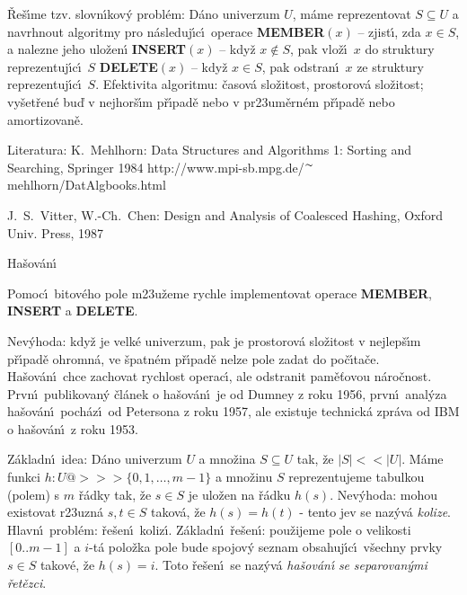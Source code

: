 \documentclass[a4paper,12pt]{article}
\begin{document}
\flushpar\v Re\v s\'\i me tzv. slovn\'\i kov\'y probl\'em: D\'ano 
univerzum $U$, m\'ame reprezentovat $S\subseteq U$ a navrhnout algoritmy pro 
n\'asle\-duj\'\i c\'\i\ operace\newline 
{\bf MEMBER$(x)$} -- zjist\'\i , zda $x\in S$, a nalezne jeho 
ulo\v zen\'\i\newline 
{\bf INSERT$(x)$} -- kdy\v z $x\notin S$, pak vlo\v z\'\i\ $x$ do struktury 
repre\-zentuj\'\i c\'\i\ $S$\newline 
{\bf DELETE$(x)$} -- kdy\v z $x\in S$, pak odstran\'\i\ $x$ ze struktury 
reprezentuj\'\i c\'\i\ $S$.\newline 
Efektivita algoritmu: \v casov\'a slo\v zitost, prostorov\'a 
slo\v zitost;\newline 
vy\-\v set\v ren\'e bu\v d v nejhor\v s\'\i m p\v r\'\i pad\v e nebo v 
pr\accent23um\v ern\'em p\v r\'\i pad\v e nebo amortizovan\v e.
\medskip

\flushpar Literatura:\newline 
K.~Mehlhorn: Data Structures and Algorithms 1: Sorting 
and Searching, Springer 1984\newline 
http://www.mpi-sb.mpg.de/$^{\thicksim}$mehlhorn/DatAlgbooks.html
\smallskip

\flushpar J.~S.~Vitter, W.-Ch.~Chen: Design and Analysis of 
Coalesced Hashing, Oxford Univ. Press, 1987
\newpage

\heading
Ha\v sov\'an\'\i
\endheading

\flushpar Pomoc\'\i\ bitov\'eho pole m\accent23u\v zeme rychle 
implementovat operace {\bf MEMBER}, {\bf INSERT} a {\bf DELETE}. 

\flushpar Nev\'yhoda: kdy\v z je velk\'e univerzum, pak je prostorov\'a 
slo\v zitost v nejlep\v s\'\i m p\v r\'\i pad\v e ohrom\-n\'a, ve \v spatn\'em 
p\v r\'\i pad\v e nelze pole zadat do po\v c\'\i ta\v ce.\newline 
Ha\v sov\'an\'\i\ chce zachovat rychlost operac\'\i , ale odstranit 
pam\v e\v to\-vou n\'aro\v cnost. Prvn\'\i\ publikovan\'y \v cl\'anek o 
ha\v sov\'an\'\i\ je od Dumney z roku 1956, prvn\'\i\ anal\'yza ha\v sov\'an\'\i\ 
poch\'az\'\i\ od Petersona z roku 1957, ale existuje technick\'a  
zpr\'ava od IBM o ha\v sov\'an\'\i\ z roku 1953.
\medskip

\flushpar Z\'akladn\'\i\ idea: D\'ano univerzum $U$ a mno\v zina 
$S\subseteq U$ tak, \v ze $|S|<<|U|$. M\'ame funkci 
$h:U@>>>\{0,1,\dots,m-1\}$ a mno\v zinu $S$ reprezentujeme 
tabulkou (polem) s $m$ \v r\'adky tak, \v ze $s\in S$ je ulo\v zen na 
\v r\'adku $h(s)$.\newline 
Nev\'yhoda: mohou existovat r\accent23uzn\'a $s,t\in S$ takov\'a, 
\v ze $h(s)=h(t)$ - tento jev se naz\'yv\'a \emph{kolize}.\newline 
Hlavn\'\i\ probl\'em: \v re\v sen\'\i\ koliz\'\i .\newline 
Z\'akladn\'\i\ \v re\v sen\'\i : pou\v zijeme pole o velikosti $[
0..m-1]$ a 
$i$-t\'a polo\v zka pole bude spojov\'y seznam obsahuj\'\i c\'\i\ 
v\v sechny prvky $s\in S$ takov\'e, \v ze $h(s)=i$. Toto \v re\v sen\'\i\ se 
naz\'yv\'a \emph{ha\v sov\'an\'\i} \emph{se} \emph{separovan\'ymi} 
\emph{\v ret\v ezci}.
\end{document}
